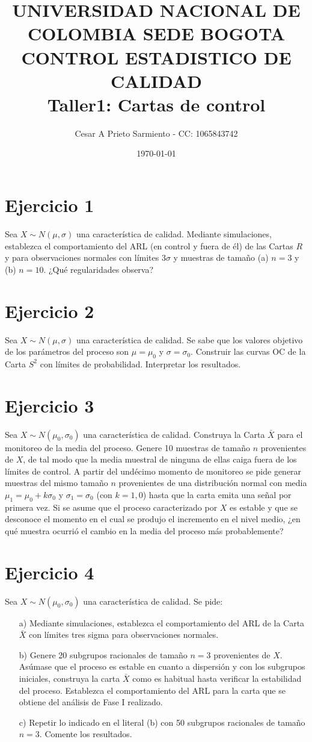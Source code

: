 \documentclass[11pt]{article}\usepackage[]{graphicx}\usepackage[table]{xcolor}
\title{UNIVERSIDAD NACIONAL DE COLOMBIA SEDE BOGOTA\\ CONTROL ESTADISTICO DE CALIDAD\\Taller1: Cartas de control }
\author{Cesar A Prieto Sarmiento - CC: 1065843742}
\date{\today}
\begin{document}
\maketitle

\section*{Ejercicio 1}
Sea $X \sim N(\mu, \sigma)$ una característica de calidad. Mediante simulaciones, establezca el comportamiento del ARL (en control y fuera de él) de las Cartas $R$ y para observaciones normales con límites $3 \sigma$ y muestras de tamaño (a) $n=3$ y (b) $n=10$. ¿Qué regularidades observa?

\section*{Ejercicio 2}
Sea $X \sim N(\mu, \sigma)$ una característica de calidad. Se sabe que los valores objetivo de los parámetros del proceso son $\mu=\mu_0$ y $\sigma=\sigma_0$. Construir las curvas OC de la Carta $S^2$ con límites de probabilidad. Interpretar los resultados.

\section*{Ejercicio 3}
Sea $X \sim N(\mu_0, \sigma_0)$ una característica de calidad. Construya la Carta $\bar{X}$ para el monitoreo de la media del proceso. Genere 10 muestras de tamaño $n$ provenientes de $X$, de tal modo que la media muestral de ninguna de ellas caiga fuera de los límites de control. A partir del undécimo momento de monitoreo se pide generar muestras del mismo tamaño $n$ provenientes de una distribución normal con media $\mu_1=\mu_0+k \sigma_0$ y $\sigma_1=\sigma_0$ (con $k=1,0$) hasta que la carta emita una señal por primera vez. Si se asume que el proceso caracterizado por $X$ es estable y que se desconoce el momento en el cual se produjo el incremento en el nivel medio, ¿en qué muestra ocurrió el cambio en la media del proceso más probablemente?

\section*{Ejercicio 4}
Sea $X \sim N(\mu_0, \sigma_0)$ una característica de calidad. Se pide:
\begin{enumerate}
    \item[a)] Mediante simulaciones, establezca el comportamiento del ARL de la Carta $\bar{X}$ con límites tres sigma para observaciones normales.
    \item[b)] Genere 20 subgrupos racionales de tamaño $n=3$ provenientes de $X$. Asúmase que el proceso es estable en cuanto a dispersión y con los subgrupos iniciales, construya la carta $\bar{X}$ como es habitual hasta verificar la estabilidad del proceso. Establezca el comportamiento del ARL para la carta que se obtiene del análisis de Fase I realizado.
    \item[c)] Repetir lo indicado en el literal (b) con 50 subgrupos racionales de tamaño $n=3$. Comente los resultados.
\end{enumerate}
\end{document}
